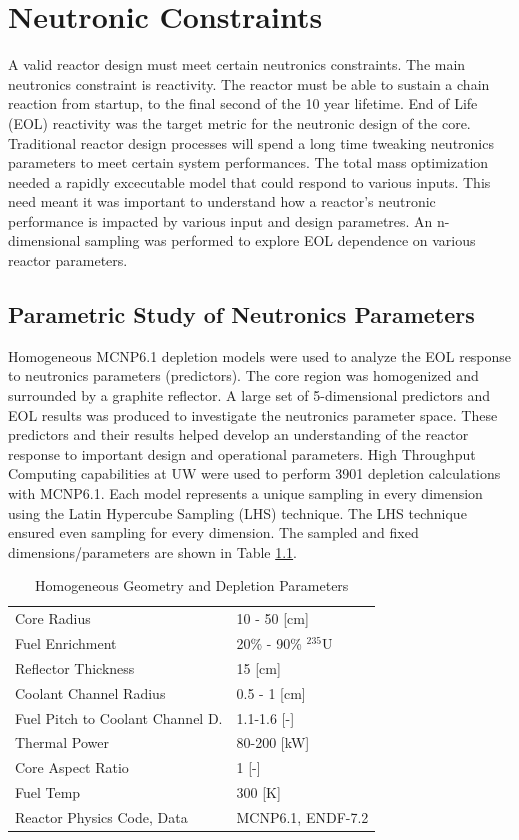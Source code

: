 \chapter{Neutronic Constraints} \label{ch:sweeps}
A valid reactor design must meet certain neutronics constraints. The main
neutronics constraint is reactivity. The reactor must be able to sustain a chain
reaction from startup, to the final second of the 10 year lifetime. End of Life
(EOL) reactivity was the target metric for the neutronic design of the core.
Traditional reactor design processes will spend a long time tweaking neutronics
parameters to meet certain system performances. The total mass optimization
needed a rapidly excecutable model that could respond to various inputs.
This need meant it was important to understand how a reactor's neutronic
performance is impacted by various input and design parametres. An n-dimensional 
sampling was performed to explore EOL \keff dependence on various reactor parameters.

\section{Parametric Study of Neutronics Parameters}
Homogeneous MCNP6.1 depletion models were used to analyze the EOL \keff response
to neutronics parameters (predictors). The core region was homogenized and
surrounded by a graphite reflector. A large set of 5-dimensional predictors and
EOL \keff results was produced to investigate the neutronics parameter space.
These predictors and their results helped develop an understanding of the
reactor response to important design and operational parameters. High Throughput
Computing capabilities at UW were used to perform 3901 depletion calculations
with MCNP6.1. Each model represents a unique sampling in every dimension using
the Latin Hypercube Sampling (LHS) technique\citep{LHS}. The LHS technique ensured even
sampling for every dimension. The sampled and fixed dimensions/parameters are
shown in Table \ref{tab:lhs_sweep_vars}.

\begin{table}[h]
  \centering
  \caption{Homogeneous Geometry and Depletion Parameters}
  \begin{tabular}{ll}
    \toprule
     Core Radius                		   & 10 - 50 [cm] \\
     Fuel Enrichment 					   & 20\% - 90\% $^{235}$U\\
     Reflector Thickness				   & 15 [cm]\\
     Coolant Channel Radius                & 0.5 - 1 [cm] \\
     Fuel Pitch to Coolant Channel D.      & 1.1-1.6 [-]\\
     Thermal Power						   & 80-200 [kW]\\
     Core Aspect Ratio					   & 1 [-] \\
     Fuel Temp  						   & 300 [K]\\
     Reactor Physics Code, Data			   & MCNP6.1, ENDF-7.2
  \end{tabular}
  \label{tab:lhs_sweep_vars}
\end{table}

